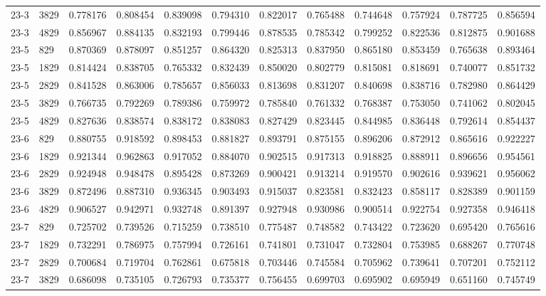 \begin{longtable}{llrrrrrrrrrr}
23-3 & 3829 & 0.778176 & 0.808454 & 0.839098 & 0.794310 & 0.822017 & 0.765488 & 0.744648 & 0.757924 & 0.787725 & 0.856594\\
23-3 & 4829 & 0.856967 & 0.884135 & 0.832193 & 0.799446 & 0.878535 & 0.785342 & 0.799252 & 0.822536 & 0.812875 & 0.901688\\
23-5 & 829 & 0.870369 & 0.878097 & 0.851257 & 0.864320 & 0.825313 & 0.837950 & 0.865180 & 0.853459 & 0.765638 & 0.893464\\
23-5 & 1829 & 0.814424 & 0.838705 & 0.765332 & 0.832439 & 0.850020 & 0.802779 & 0.815081 & 0.818691 & 0.740077 & 0.851732\\
23-5 & 2829 & 0.841528 & 0.863006 & 0.785657 & 0.856033 & 0.813698 & 0.831207 & 0.840698 & 0.838716 & 0.782980 & 0.864429\\
23-5 & 3829 & 0.766735 & 0.792269 & 0.789386 & 0.759972 & 0.785840 & 0.761332 & 0.768387 & 0.753050 & 0.741062 & 0.802045\\
23-5 & 4829 & 0.827636 & 0.838574 & 0.838172 & 0.838083 & 0.827429 & 0.823445 & 0.844985 & 0.836448 & 0.792614 & 0.854437\\
23-6 & 829 & 0.880755 & 0.918592 & 0.898453 & 0.881827 & 0.893791 & 0.875155 & 0.896206 & 0.872912 & 0.865616 & 0.922227\\
23-6 & 1829 & 0.921344 & 0.962863 & 0.917052 & 0.884070 & 0.902515 & 0.917313 & 0.918825 & 0.888911 & 0.896656 & 0.954561\\
23-6 & 2829 & 0.924948 & 0.948478 & 0.895428 & 0.873269 & 0.900421 & 0.913214 & 0.919570 & 0.902616 & 0.939621 & 0.956062\\
23-6 & 3829 & 0.872496 & 0.887310 & 0.936345 & 0.903493 & 0.915037 & 0.823581 & 0.832423 & 0.858117 & 0.828389 & 0.901159\\
23-6 & 4829 & 0.906527 & 0.942971 & 0.932748 & 0.891397 & 0.927948 & 0.930986 & 0.900514 & 0.922754 & 0.927358 & 0.946418\\
23-7 & 829 & 0.725702 & 0.739526 & 0.715259 & 0.738510 & 0.775487 & 0.748582 & 0.743422 & 0.723620 & 0.695420 & 0.765616\\
23-7 & 1829 & 0.732291 & 0.786975 & 0.757994 & 0.726161 & 0.741801 & 0.731047 & 0.732804 & 0.753985 & 0.688267 & 0.770748\\
23-7 & 2829 & 0.700684 & 0.719704 & 0.762861 & 0.675818 & 0.703446 & 0.745584 & 0.705962 & 0.739641 & 0.707201 & 0.752112\\
23-7 & 3829 & 0.686098 & 0.735105 & 0.726793 & 0.735377 & 0.756455 & 0.699703 & 0.695902 & 0.695949 & 0.651160 & 0.745749\\

\end{longtable}
